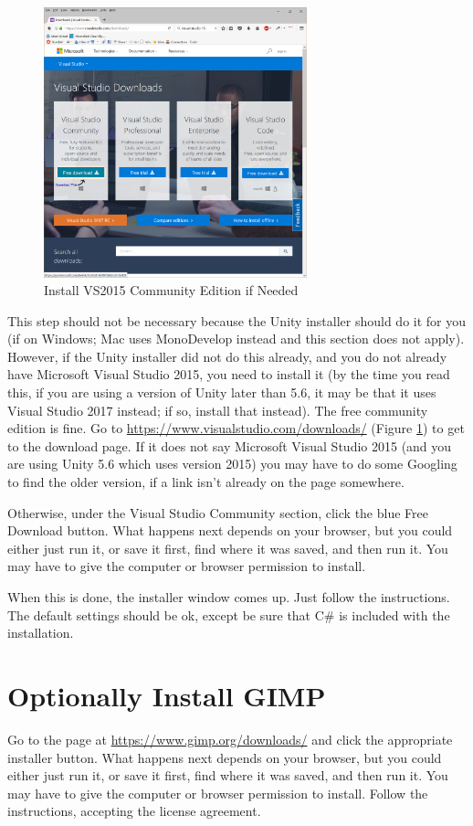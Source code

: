\documentclass[12pt]{amsbook}
\theoremstyle{definition}
\theoremstyle{remark}
\numberwithin{figure}{chapter}
\numberwithin{table}{chapter}
\numberwithin{section}{chapter}
\numberwithin{equation}{section}
\newcommand{\csharp}{\ensuremath{\mbox{C}\#}\xspace}
\begin{document}
\begin{figure}[h]
  \includegraphics[width=3in]{vsweb.png}
  \caption{Install VS2015 Community Edition if Needed}
  \label{fig:vsw}
\end{figure}
  
This step should not be necessary because the Unity installer should do it for you (if on Windows; Mac uses MonoDevelop instead and this section does not apply).  However, if the Unity installer did not do this already, and you do not already have Microsoft Visual Studio 2015, you need to install it (by the time you read this, if you are using a version of Unity later than 5.6, it may be that it uses Visual Studio 2017 instead; if so, install that instead).  The free community edition is fine.  Go to \url{https://www.visualstudio.com/downloads/} (Figure \ref{fig:vsw}) to get to the download page.  If it does not say Microsoft Visual Studio 2015 (and you are using Unity 5.6 which uses version 2015) you may have to do some Googling to find the older version, if a link isn't already on the page somewhere.

Otherwise, under the Visual Studio Community section, click the blue Free Download button.  What happens next depends on your browser, but you could either just run it, or save it first, find where it was saved, and then run it.  You may have to give the computer or browser permission to install.

When this is done, the installer window comes up.  Just follow the instructions.  The default settings should be ok, except be sure that \csharp is included with the installation.

\section{Optionally Install GIMP}
Go to the page at \url{https://www.gimp.org/downloads/} and click the appropriate installer button.  What happens next depends on your browser, but you could either just run it, or save it first, find where it was saved, and then run it.  You may have to give the computer or browser permission to install.  Follow the instructions, accepting the license agreement.
\end{document}
